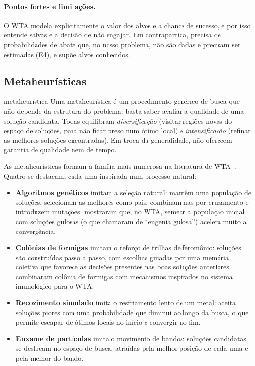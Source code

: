 \paragraph{Pontos fortes e limitações.} O WTA modela explicitamente o valor dos alvos e a chance de sucesso, e por isso
entende salvas e a decisão de não engajar. Em contrapartida, precisa de probabilidades de abate que, no nosso problema,
não são dadas e precisam ser estimadas (E4), e supõe alvos conhecidos.

\subsection{Metaheurísticas}

\begin{conceitobox}{metaheurística}
Uma metaheurística é um procedimento genérico de busca que não depende da estrutura do problema: basta saber avaliar a
qualidade de uma solução candidata. Todas equilibram \emph{diversificação} (visitar regiões novas do espaço de soluções,
para não ficar preso num ótimo local) e \emph{intensificação} (refinar as melhores soluções encontradas). Em troca da
generalidade, não oferecem garantia de qualidade nem de tempo.
\end{conceitobox}

As metaheurísticas formam a família mais numerosa na literatura de WTA~\cite{kline2019}. Quatro se destacam, cada uma
inspirada num processo natural:
\begin{itemize}
  \item \textbf{Algoritmos genéticos} imitam a seleção natural: mantêm uma população de soluções, selecionam as melhores
        como pais, combinam-nas por cruzamento e introduzem mutações. \citet{lee2003ga} mostraram que, no WTA, semear a
        população inicial com soluções gulosas (o que chamaram de ``eugenia gulosa'') acelera muito a convergência.
  \item \textbf{Colônias de formigas} imitam o reforço de trilhas de feromônio: soluções são construídas passo a passo,
        com escolhas guiadas por uma memória coletiva que favorece as decisões presentes nas boas soluções anteriores.
        \citet{lee2002aco} combinaram colônia de formigas com mecanismos inspirados no sistema imunológico para o WTA.
  \item \textbf{Recozimento simulado} imita o resfriamento lento de um metal: aceita soluções piores com uma probabilidade
        que diminui ao longo da busca, o que permite escapar de ótimos locais no início e convergir no fim.
  \item \textbf{Enxame de partículas} imita o movimento de bandos: soluções candidatas se deslocam no espaço de busca,
        atraídas pela melhor posição de cada uma e pela melhor do bando.
\end{itemize}

